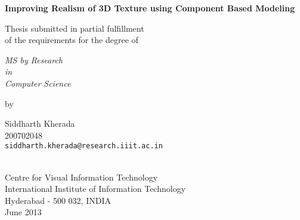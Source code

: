 \thispagestyle{empty}
\begin{center}
\vspace*{1.5cm}
{\Large \bf Improving Realism of 3D Texture using Component Based Modeling}

\vspace*{3.75cm}
{\large Thesis submitted in partial fulfillment\\}
{\large  of the requirements for the degree of \\}

\vspace*{1cm}
{\it {\large MS by Research} \\
{\large in\\}
{\large Computer Science\\}}

\vspace*{1cm}
{\large by}

\vspace*{5mm}
{\large Siddharth Kherada\\}
{\large 200702048\\
{\small \tt siddharth.kherada@research.iiit.ac.in}}


\vspace*{4.0cm}
{\\}
{\large Centre for Visual Information Technology\\}
{\large International Institute of Information Technology\\}
{\large Hyderabad - 500 032, INDIA\\}
{\large June 2013\\}
\end{center}